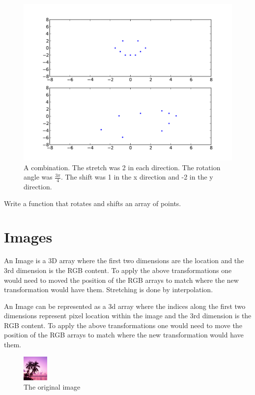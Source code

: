 \begin{figure}
\centering
\includegraphics[width=\textwidth]{combo.pdf}
\caption{A combination. The stretch was 2 in each direction. The rotation angle was $\frac{3\pi}{4}$. The shift was 1 in the x direction and -2 in the y direction.}
\label{basis:combo}
\end{figure}

\begin{problem}
Write a function that rotates and shifts an array of points.
\end{problem}

\section*{Images}
An Image is a 3D array where the first two dimensions are the location and the 3rd dimension is the RGB content. To apply the above transformations one would need to moved the position of the RGB arrays to match where the new transformation would have them. Stretching is done by interpolation.

An Image can be represented as a 3d array where the indices along the first two dimensions represent pixel location within the image and the 3rd dimension is the RGB content.
To apply the above transformations one would need to move the position of the RGB arrays to match where the new transformation would have them.

\begin{figure}
\centering
\includegraphics[scale=2.0]{dream.png}
\caption{The original image}
\end{figure}

